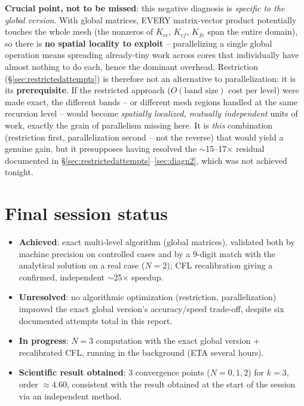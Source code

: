 \documentclass[11pt]{article}
\begin{document}
\textbf{Crucial point, not to be missed}: this negative diagnosis is
\emph{specific to the global version}. With global matrices, EVERY
matrix-vector product potentially touches the whole mesh (the nonzeros
of $K_{cc}$, $K_{cf}$, $K_{fc}$ span the entire domain), so there is
\textbf{no spatial locality to exploit} -- parallelizing a single
global operation means spreading already-tiny work across cores that
individually have almost nothing to do each, hence the dominant
overhead. Restriction (\S\ref{sec:restrictedattempts}) is therefore not
an alternative to parallelization: it is its \textbf{prerequisite}. If
the restricted approach ($O(\text{band size})$ cost per level) were
made exact, the different bands -- or different mesh regions handled at
the same recursion level -- would become \emph{spatially localized,
mutually independent} units of work, exactly the grain of parallelism
missing here. It is \emph{this} combination (restriction first,
parallelization second -- not the reverse) that would yield a genuine
gain, but it presupposes having resolved the $\sim$15--17$\times$
residual documented in \S\ref{sec:restrictedattempts}--\ref{sec:diagn2},
which was not achieved tonight.

\section{Final session status}

\begin{itemize}
  \item \textbf{Achieved}: exact multi-level algorithm (global
  matrices), validated both by machine precision on controlled cases
  and by a 9-digit match with the analytical solution on a real case
  ($N=2$); CFL recalibration giving a confirmed, independent
  $\sim$25$\times$ speedup.
  \item \textbf{Unresolved}: no algorithmic optimization (restriction,
  parallelization) improved the exact global version's
  accuracy/speed trade-off, despite six documented attempts total in
  this report.
  \item \textbf{In progress}: $N=3$ computation with the exact global
  version + recalibrated CFL, running in the background (ETA several
  hours).
  \item \textbf{Scientific result obtained}: 3 convergence points
  ($N=0,1,2$) for $k=3$, order $\approx4.60$, consistent with the
  result obtained at the start of the session via an independent
  method.
\end{itemize}
\end{document}
